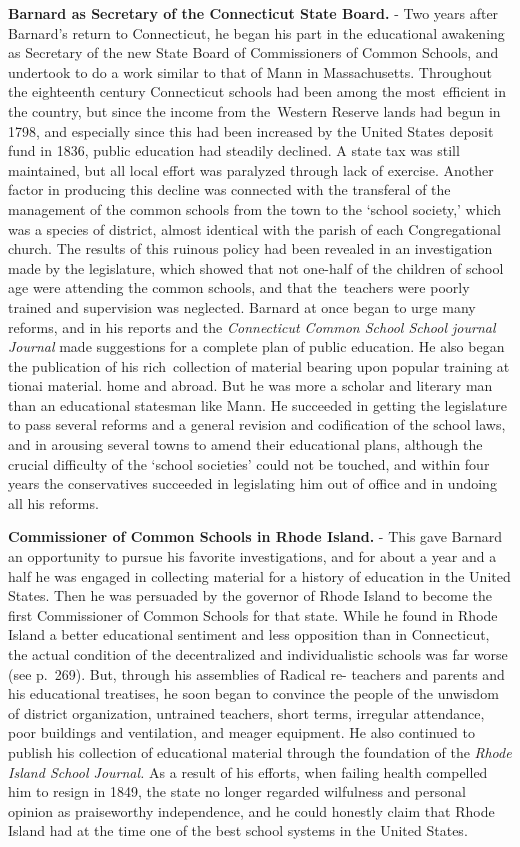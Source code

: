 \documentclass[
]{book}
\begin{document}
\textbf{Barnard as Secretary of the Connecticut State Board.} - Two years after Barnard's return to Connecticut, he began his part in the educational awakening as Secretary of the new State Board of Commissioners of Common Schools, and undertook to do a work similar to that of Mann in Massachusetts. Throughout the eighteenth century Connecticut schools had been among the most~efficient in the country, but since the income from the~Western Reserve lands had begun in 1798, and especially since this had been increased by the United States deposit fund in 1836, public education had steadily declined. A state tax was still maintained, but all local effort was paralyzed through lack of exercise. Another factor in producing this decline was connected with the transferal of the management of the common schools from the town to the `school society,' which was a species of district, almost identical with the parish of each Congregational church. The results of this ruinous policy had been revealed in an investigation made by the legislature, which showed that not one-half of the children of school age were attending the common schools, and that the~teachers were poorly trained and supervision was neglected. Barnard at once began to urge many reforms, and in his reports and the \emph{Connecticut Common School School journal Journal} made suggestions for a complete plan of public education. He also began the publication of his rich~collection of material bearing upon popular training at tionai material. home and abroad. But he was more a scholar and literary man than an educational statesman like Mann. He succeeded in getting the legislature to pass several reforms and a general revision and codification of the school laws, and in arousing several towns to amend their educational plans, although the crucial difficulty of the `school societies' could not be touched, and within four years the conservatives succeeded in legislating him out of office and in undoing all his reforms.

\textbf{Commissioner of Common Schools in Rhode Island.} - This gave Barnard an opportunity to pursue his favorite investigations, and for about a year and a half he was engaged in collecting material for a history of education in the United States. Then he was persuaded by the governor of Rhode Island to become the first Commissioner of Common Schools for that state. While he found in Rhode Island a better educational sentiment and less opposition than in Connecticut, the actual condition of the decentralized and individualistic schools was far worse (see p.~269). But, through his assemblies of Radical re- teachers and parents and his educational treatises, he soon began to convince the people of the unwisdom of district organization, untrained teachers, short terms, irregular attendance, poor buildings and ventilation, and meager equipment. He also continued to publish his collection of educational material through the foundation of the \emph{Rhode Island School Journal.} As a result of his efforts, when failing health compelled him to resign in 1849, the state no longer regarded wilfulness and personal opinion as praiseworthy independence, and he could honestly claim that Rhode Island had at the time one of the best school systems in the United States.
\end{document}
